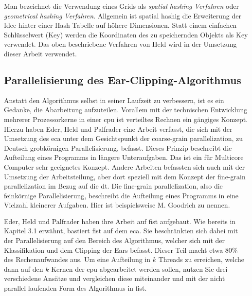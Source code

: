 Man bezeichnet die Verwendung eines Grids als \emph{spatial hashing Verfahren} oder \emph{geometrical hashing Verfahren}. Allgemein ist spatial hashig die Erweiterung der Idee hinter einer Hash Tabelle auf höhere Dimensionen. Statt einem einfachen Schlüsselwert (Key) werden die Koordinaten des 
zu speichernden Objekts als Key verwendet.\cite{spatialhash}
Das oben beschriebene Verfahren von Held wird in der Umsetzung dieser Arbeit verwendet.
\subsection{Parallelisierung des Ear-Clipping-Algorithmus}

Anstatt den Algorithmus selbst in seiner Laufzeit zu verbessern, ist es ein Gedanke, die Abarbeitung aufzuteilen. Vorallem mit der technischen Entwicklung mehrerer Prozessorkerne in einer \ac{cpu}
ist verteiltes Rechnen ein gängiges Konzept. Hierzu haben Eder, Held und Palfrader eine Arbeit verfasst, die sich mit der Umsetzung des \ac{eca} unter dem Gesichtspunkt der coarse-grain parallelization,
zu Deutsch grobkörnigen Parallelisierung, befasst.\cite{paralleleca} Dieses Prinzip beschreibt die Aufteilung eines Programms in längere Unteraufgaben. Das ist ein für Multicore Computer sehr geeignetes Konzept.
Andere Arbeiten befassten sich auch mit der Umsetzung der Arbeitsteilung, aber dort speziell mit dem Konzept der fine-grain parallelization im Bezug auf die \ac{dt}. Die fine-grain parallelization, also die feinkörnige 
Parallelisierung, beschreibt die Aufteilung eines Programms in eine Vielzahl kleinerer Aufgaben. 
Hier ist beispielsweise M. Goodrich\cite{goodrich} zu nennen.

Eder, Held und Palfrader haben ihre Arbeit auf \ac{fist} aufgebaut. Wie bereits in Kapitel 3.1 erwähnt, bastiert \ac{fist} auf dem \ac{eca}.\cite{paralleleca}
Sie beschränkten sich dabei mit der Parallelisierung auf den Bereich des Algorithmus, welcher sich mit der Klassifikation und dem Clipping der Ears befasst. Dieser Teil macht etwa $80\%$ des Rechenaufwandes aus.
Um eine Aufteilung in $k$ Threads zu erreichen, welche dann auf den $k$ Kernen der \ac{cpu} abgearbeitet werden sollen, nutzen Sie drei verschiedene Ansätze und vergleichen diese miteinander und mit der nicht parallel 
laufenden Form des Algorithmus in \ac{fist}.

